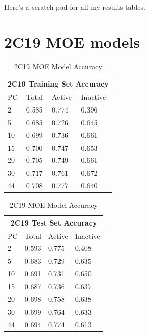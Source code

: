 Here's a scratch pad for all my results tables.

\section{2C19 MOE models}

\begin{table}[!h]
\begin{minipage}{.5\linewidth}
\centering
\begin{tabular}{|l|l|l|l|}
\hline
\multicolumn{4}{|c|}{2C19 Training Set Accuracy} \\ \hline
PC & Total          & Active          & Inactive \\ \hline
2  & 0.585          & 0.774           & 0.396   \\ \hline
5  & 0.685          & 0.726           & 0.645   \\ \hline
10 & 0.699          & 0.736           & 0.661    \\ \hline
15 & 0.700          & 0.747           & 0.653    \\ \hline
20 & 0.705          & 0.749           & 0.661    \\ \hline
30 & 0.717          & 0.761           & 0.672    \\ \hline
44 & 0.708          & 0.777           & 0.640    \\ \hline
\end{tabular}
\end{minipage}%
\begin{minipage}{.5\linewidth}
\centering
\begin{tabular}{|l|l|l|l|}
\hline
\multicolumn{4}{|c|}{2C19 Test Set Accuracy}       \\ \hline
PC & Total          & Active          & Inactive   \\ \hline
2  & 0.593          & 0.775           & 0.408      \\ \hline
5  & 0.683          & 0.729           & 0.635      \\ \hline
10 & 0.691          & 0.731           & 0.650      \\ \hline
15 & 0.687          & 0.736           & 0.637      \\ \hline
20 & 0.698          & 0.758           & 0.638      \\ \hline
30 & 0.699          & 0.764           & 0.633      \\ \hline
44 & 0.694          & 0.774           & 0.613      \\ \hline
\end{tabular}
\end{minipage}
\caption{2C19 MOE Model Accuracy}
\end{table}

